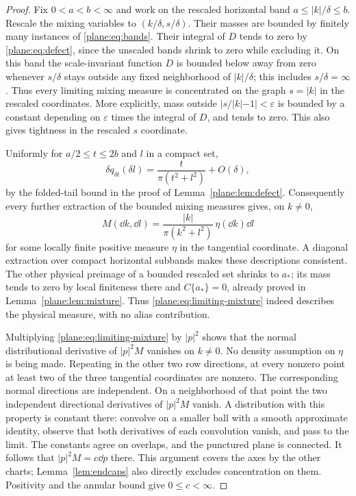 \begin{proof}
Fix $0<a<b<\infty$ and work on the rescaled horizontal band
$a\le|k|/\delta\le b$.  Rescale the mixing variables to
$(k/\delta,s/\delta)$.  Their masses are bounded by finitely many
instances of \eqref{plane:eq:bands}.  Their integral of $D$ tends to
zero by \eqref{plane:eq:defect}, since the unscaled bands shrink to
zero while excluding it.  On this band the scale-invariant function
$D$ is bounded below away from zero whenever $s/\delta$ stays outside
any fixed neighborhood of $|k|/\delta$; this includes $s/\delta=\infty$.
Thus every limiting mixing measure is concentrated on the graph
$s=|k|$ in the rescaled coordinates.  More explicitly, mass outside
$|s/|k|-1|<\varepsilon$ is bounded by a constant depending on
$\varepsilon$ times the integral of $D$, and tends to zero.
This also gives tightness in the rescaled $s$ coordinate.

Uniformly for $a/2\le t\le2b$ and $l$ in a compact set,
\[
 \delta q_{\delta t}(\delta l)
     =\frac{t}{\pi(t^2+l^2)}+O(\delta),
\]
by the folded-tail bound in the proof of
Lemma~\ref{plane:lem:defect}.  Consequently every further extraction
of the bounded mixing measures gives, on $k\ne0$,
\begin{equation}
 \label{plane:eq:limiting-mixture}
 M(\dd k,\dd l)=
     \frac{|k|}{\pi(k^2+l^2)}\,\eta(\dd k)\dd l
\end{equation}
for some locally finite positive measure $\eta$ in the tangential
coordinate.  A diagonal extraction over compact horizontal subbands
makes these descriptions consistent.  The other physical preimage of
a bounded rescaled set shrinks to $a_*$; its mass tends to zero by
local finiteness there and $C\{a_*\}=0$, already proved in
Lemma~\ref{plane:lem:mixture}.  Thus \eqref{plane:eq:limiting-mixture}
indeed describes the physical measure, with no alias contribution.

Multiplying \eqref{plane:eq:limiting-mixture} by $|p|^2$ shows that
the normal distributional derivative of $|p|^2M$ vanishes on $k\ne0$.
No density assumption on $\eta$ is being made.  Repeating in the
other two row directions, at every nonzero point at least two
of the three tangential coordinates are nonzero.  The corresponding
normal directions are independent.  On a neighborhood of that point
the two independent directional derivatives of $|p|^2M$ vanish.
A distribution with this property is constant there: convolve on a
smaller ball with a smooth approximate identity, observe that both
derivatives of each convolution vanish, and pass to the limit.
The constants agree on overlaps, and the punctured plane is connected.
It follows that $|p|^2M=c\dd p$ there.  This argument covers the
axes by the other charts; Lemma~\ref{lem:endcaps} also directly
excludes concentration on them.  Positivity and the annular bound
give $0\le c<\infty$.
\end{proof}

